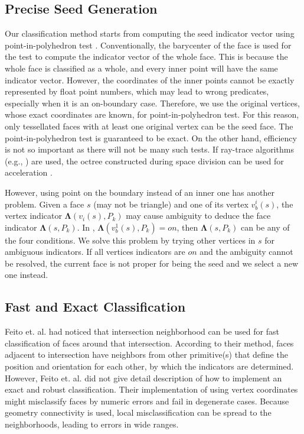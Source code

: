 \documentclass[10pt,journal,compsoc]{IEEEtran}
\begin{document}
\subsection{Precise Seed Generation}

Our classification method starts from computing the seed indicator vector using point-in-polyhedron test \cite{ogayar2005point}. Conventionally, the barycenter of the face is used for the test to compute the indicator vector of the whole face. This is because the whole face is classified as a whole, and every inner point will have the same indicator vector. However, the coordinates of the inner points cannot be exactly represented by float point numbers, which may lead to wrong predicates, especially when it is an on-boundary case. Therefore, we use the original vertices, whose exact coordinates are known, for point-in-polyhedron test. For this reason, only tessellated faces with at least one original vertex can be the seed face. The point-in-polyhedron test is guaranteed to be exact. On the other hand, efficiency is not so important as there will not be many such tests. If ray-trace algorithms (e.g., \cite{frisken2002simple}) are used, the octree constructed during space division can be used for acceleration \cite{havran1999summary}.

However, using point on the boundary instead of an inner one has another problem. Given a face $s$ (may not be triangle) and one of its vertex $v_b^i(s)$, the vertex indicator $\boldsymbol{\Lambda}(v_{i}(s), P_k)$ may cause ambiguity to deduce the face indicator $\boldsymbol{\Lambda}(s, P_k)$. In {\color{red}{Fig. ?}}, $\boldsymbol{\Lambda}(v_b^1(s), P_k) = on$, then $\boldsymbol{\Lambda}(s, P_k)$ can be any of the four conditions. We solve this problem by trying other vertices in $s$ for ambiguous indicators. If all vertices indicators are $on$ and the ambiguity cannot be resolved, the current face is not proper for being the seed and we select a new one instead.

\subsection{Fast and Exact Classification}

\label{sec:individual}

Feito et. al. \cite{feito2013fast} had noticed that intersection neighborhood can be used for fast classification of faces around that intersection. According to their method, faces adjacent to intersection have neighbors from other primitive(s) that define the position and orientation for each other, by which the indicators are determined. However, Feito et. al. did not give detail description of how to implement an exact and robust classification. Their implementation of using vertex coordinates might misclassify faces by numeric errors and fail in degenerate cases. Because geometry connectivity is used, local misclassification can be spread to the neighborhoods, leading to errors in wide ranges.
\end{document}
